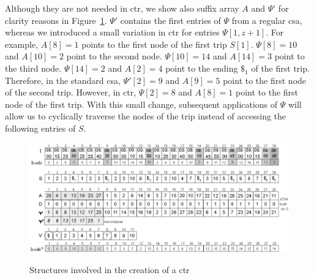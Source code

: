 	Although they are not needed in \gls{ctr}, we show also suffix array $A$ and $\Psi$' for clarity reasons in Figure~\ref{fig:tcsa}. 
	$\Psi'$  contains the first entries of $\Psi$ from a regular \gls{csa}, whereas we introduced a small variation
	in \gls{ctr} for entries $\Psi[1,z+1]$.  %
	For example, $A[8]=1$ points to the first node of the first trip $S[1]$.
	$\Psi[8]=10$ and $A[10]=2$ point to the second node.  $\Psi[10]=14$ and $A[14]=3$ point to the third node.
	$\Psi[14]=2$ and $A[2]=4$ point to the ending $\$_1$ of the first trip. Therefore, in the standard 
	\gls{csa}, $\Psi'[2]=9$ and $A[9]=5$  point to the first node of the second trip. 
	However, in  \gls{ctr}, $\Psi[2]=8$ and $A[8]=1$ point
	to the first node of the first trip. With this small change, subsequent applications of $\Psi$ will allow 
	us to cyclically traverse the nodes of the trip instead of accessing the following entries of $S$.


	\begin{figure}[h!]
	  \begin{center}
	  {\includegraphics[width=1.00\textwidth]{figures/csttr.eps}}
	  \end{center}
	  \caption{Structures involved in the creation of a \acrlong{ctr}}
	  \label{fig:tcsa}
	\end{figure}




